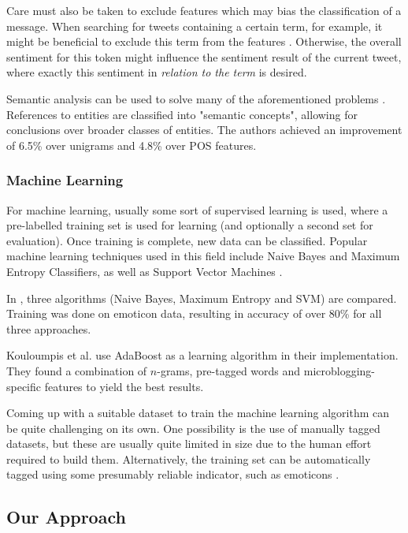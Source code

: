 \documentclass{sig-alternate}
\begin{document}
Care must also be taken to exclude features which may bias the classification of a message. When searching for tweets containing a certain term, for example, it might be beneficial to exclude this term from the features \cite{go2009twitter}. Otherwise, the overall sentiment for this token might influence the sentiment result of the current tweet, where exactly this sentiment in \textit{relation to the term} is desired.

Semantic analysis can be used to solve many of the aforementioned problems \cite{saif2012semantic}. References to entities are classified into "semantic concepts", allowing for conclusions over broader classes of entities. The authors achieved an improvement of 6.5\% over unigrams and 4.8\% over POS features.

\subsubsection{Machine Learning}

For machine learning, usually some sort of supervised learning is used, where a pre-labelled training set is used for learning (and optionally a second set for evaluation). Once training is complete, new data can be classified. Popular machine learning techniques used in this field include Naive Bayes and Maximum Entropy Classifiers, as well as Support Vector Machines \cite{vinodhini2012sentiment}.

In \cite{go2009twitter}, three algorithms (Naive Bayes, Maximum Entropy and SVM) are compared. Training was done on emoticon data, resulting in accuracy of over 80\% for all three approaches.

Kouloumpis et al. \cite{kouloumpis2011twitter} use AdaBoost as a learning algorithm in their implementation. They found a combination of $n$-grams, pre-tagged words and microblogging-specific features to yield the best results.



Coming up with a suitable dataset to train the machine learning algorithm can be quite challenging on its own. One possibility is the use of manually tagged datasets, but these are usually quite limited in size due to the human effort required to build them. Alternatively, the training set can be automatically tagged using some presumably reliable indicator, such as emoticons \cite{go2009twitter}.


\subsection{Our Approach}
\end{document}
